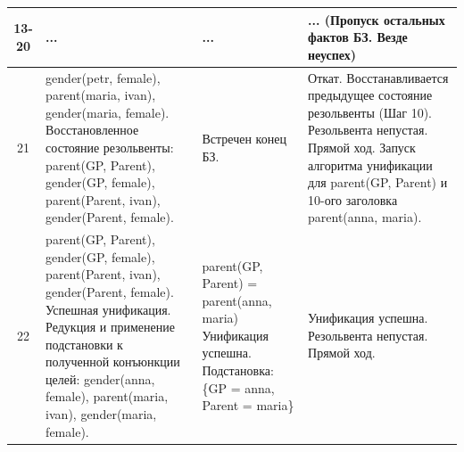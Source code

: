 \begin{tabularx}{\textwidth}{|c|>{\small}X|>{\small}X|>{\small}X|}
	13-20                                                                              &
	...                                                                                &
	...                                                                                &
	... (Пропуск остальных фактов БЗ. Везде неуспех)                                             \\
	\hline

	21                                                                                 &
	gender(petr, female), \newline
	parent(maria, ivan), \newline
	gender(maria, female). \newline
	Восстановленное состояние резольвенты: \newline
	parent(GP, Parent), \newline
	gender(GP, female), \newline
	parent(Parent, ivan), \newline
	gender(Parent, female).                                                            &
	Встречен конец БЗ.                                                                 &
	Откат. Восстанавливается предыдущее состояние резольвенты (Шаг 10). \newline
	Резольвента непустая. \newline
	Прямой ход. \newline
	Запуск алгоритма унификации для parent(GP, Parent) и 10-ого заголовка parent(anna, maria).   \\
	\hline

	22                                                                                 &
	parent(GP, Parent), \newline
	gender(GP, female), \newline
	parent(Parent, ivan), \newline
	gender(Parent, female). \newline
	Успешная унификация. \newline
	Редукция и применение подстановки к полученной конъюнкции целей: \newline
	gender(anna, female), \newline
	parent(maria, ivan), \newline
	gender(maria, female).                                                             &
	parent(GP, Parent) = \newline
	parent(anna, maria) \newline
	Унификация успешна. \newline
	Подстановка: \newline
	\{GP = anna, Parent = maria\}                                                      &
	Унификация успешна. \newline
	Резольвента непустая. \newline
	Прямой ход.                                                                                  \\
	\hline


\end{tabularx}
